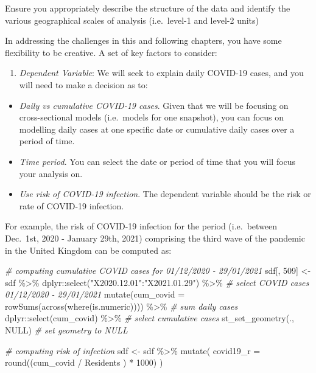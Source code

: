 \documentclass[
]{book}
\newenvironment{Shaded}{\begin{snugshade}}{\end{snugshade}}
\newcommand{\AttributeTok}[1]{\textcolor[rgb]{0.77,0.63,0.00}{#1}}
\newcommand{\CommentTok}[1]{\textcolor[rgb]{0.56,0.35,0.01}{\textit{#1}}}
\newcommand{\ConstantTok}[1]{\textcolor[rgb]{0.00,0.00,0.00}{#1}}
\newcommand{\DecValTok}[1]{\textcolor[rgb]{0.00,0.00,0.81}{#1}}
\newcommand{\FunctionTok}[1]{\textcolor[rgb]{0.00,0.00,0.00}{#1}}
\newcommand{\NormalTok}[1]{#1}
\newcommand{\OtherTok}[1]{\textcolor[rgb]{0.56,0.35,0.01}{#1}}
\newcommand{\SpecialCharTok}[1]{\textcolor[rgb]{0.00,0.00,0.00}{#1}}
\newcommand{\StringTok}[1]{\textcolor[rgb]{0.31,0.60,0.02}{#1}}
\providecommand{\tightlist}{%
  \setlength{\itemsep}{0pt}\setlength{\parskip}{0pt}}
\begin{document}
Ensure you appropriately describe the structure of the data and identify the various geographical scales of
analysis (i.e.~level-1 and level-2 units)

In addressing the challenges in this and following chapters, you have some flexibility to be creative. A set of key factors to consider:

\begin{enumerate}
\def\labelenumi{\arabic{enumi}.}
\tightlist
\item
  \emph{Dependent Variable}: We will seek to explain daily COVID-19 cases, and you will need to make a decision as to:
\end{enumerate}

\begin{itemize}
\item
  \emph{Daily vs cumulative COVID-19 cases}. Given that we will be focusing on cross-sectional models (i.e.~models for one snapshot), you can focus on modelling daily cases at one specific date or cumulative daily cases over a period of time.
\item
  \emph{Time period}. You can select the date or period of time that you will focus your analysis on.
\item
  \emph{Use risk of COVID-19 infection}. The dependent variable should be the risk or rate of COVID-19 infection.
\end{itemize}

For example, the risk of COVID-19 infection for the period (i.e.~between Dec.~1st, 2020 - January 29th, 2021) comprising the third wave of the pandemic in the United Kingdom can be computed as:

\begin{Shaded}
\begin{Highlighting}[]
\CommentTok{\# computing cumulative COVID cases for  01/12/2020 {-} 29/01/2021}
\NormalTok{sdf[, }\DecValTok{509}\NormalTok{] }\OtherTok{\textless{}{-}}\NormalTok{ sdf }\SpecialCharTok{\%\textgreater{}\%}\NormalTok{ dplyr}\SpecialCharTok{::}\FunctionTok{select}\NormalTok{(}\StringTok{"X2020.12.01"}\SpecialCharTok{:}\StringTok{"X2021.01.29"}\NormalTok{) }\SpecialCharTok{\%\textgreater{}\%} \CommentTok{\# select COVID cases 01/12/2020 {-} 29/01/2021}
  \FunctionTok{mutate}\NormalTok{(}\AttributeTok{cum\_covid =} \FunctionTok{rowSums}\NormalTok{(}\FunctionTok{across}\NormalTok{(}\FunctionTok{where}\NormalTok{(is.numeric)))) }\SpecialCharTok{\%\textgreater{}\%} \CommentTok{\# sum daily cases}
\NormalTok{  dplyr}\SpecialCharTok{::}\FunctionTok{select}\NormalTok{(cum\_covid) }\SpecialCharTok{\%\textgreater{}\%} \CommentTok{\# select cumulative cases}
   \FunctionTok{st\_set\_geometry}\NormalTok{(., }\ConstantTok{NULL}\NormalTok{) }\CommentTok{\# set geometry to NULL}

\CommentTok{\# computing risk of infection}
\NormalTok{sdf }\OtherTok{\textless{}{-}}\NormalTok{ sdf }\SpecialCharTok{\%\textgreater{}\%}  \FunctionTok{mutate}\NormalTok{(}
  \AttributeTok{covid19\_r =} \FunctionTok{round}\NormalTok{((cum\_covid }\SpecialCharTok{/}\NormalTok{ Residents ) }\SpecialCharTok{*} \DecValTok{1000}\NormalTok{) }
\NormalTok{  )}
\end{Highlighting}
\end{Shaded}
\end{document}
